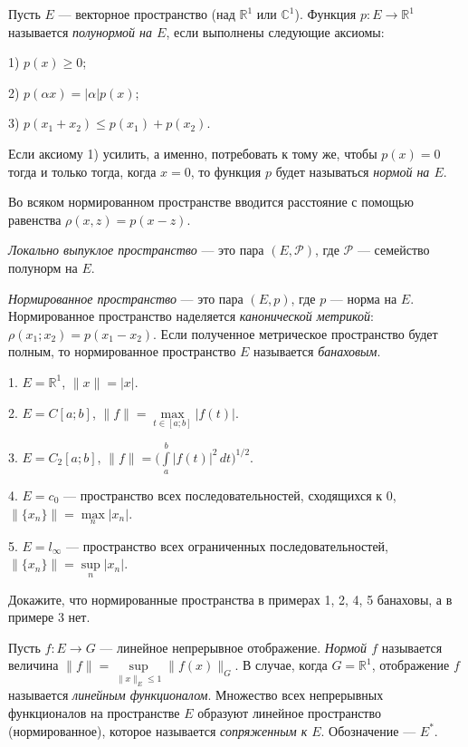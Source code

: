 \documentclass[10pt,titlepage, a4paper]{article}
\begin{document}


\begin{defen}
Пусть $E$ --- векторное пространство (над $\mathbb{R}^1$ или
$\mathbb{C}^1$). Функция $p\colon E\to\mathbb{R}^1$ называется
\emph{полунормой на $E$}, если выполнены следующие аксиомы:

1) $p(x)\geqslant0$;

2) $p(\alpha x)=|\alpha|p(x)$;

3) $p(x_1+x_2)\leqslant p(x_1)+p(x_2)$.

Если аксиому 1) усилить, а именно, потребовать к тому же, чтобы
$p(x)=0$ тогда и только тогда, когда $x=0$, то функция $p$ будет
называться \emph{нормой на $E$}.
\end{defen}

Во всяком нормированном пространстве вводится расстояние с помощью
равенства $\rho(x,z)=p(x-z)$.

\begin{defen}
\emph{Локально выпуклое пространство} --- это пара
$(E,\mathcal{P})$, где $\mathcal{P}$ --- семейство полунорм на $E$.

\emph{Нормированное пространство} --- это пара $(E,p)$, где $p$ ---
норма на $E$. Нормированное пространство наделяется
\emph{канонической метрикой}: $\rho(x_1;x_2)=p(x_1-x_2)$. Если
полученное метрическое пространство будет полным, то нормированное
пространство $E$ называется \emph{банаховым}.
\end{defen}

\prim

1. $E=\mathbb{R}^1$, $\|x\|=|x|$.

2. $E=C[a;b]$, $\|f\|=\max\limits_{t\in[a;b]}|f(t)|$.

3. $E=C_2[a;b]$,
$\|f\|=\Big(\int\limits_a^b\!|f(t)|^2\,dt\Big)^{1/2}$.

4. $E=c_0$ --- пространство всех последовательностей, сходящихся к
0, $\|\{x_n\}\|=\max\limits_n|x_n|$.

5. $E=l_\infty$ --- пространство всех ограниченных
последовательностей, $\|\{x_n\}\|=\sup\limits_n|x_n|$.

\begin{upr}
Докажите, что нормированные пространства в примерах 1, 2, 4, 5
банаховы, а в примере 3 нет.
\end{upr}

\begin{defen}
Пусть $f\colon E\to G$ --- линейное непрерывное отображение.
\emph{Нормой $f$} называется величина
$\|f\|=\sup\limits_{\|x\|_E\leqslant1}\|f(x)\|_G$. В случае, когда
$G=\mathbb{R}^1$, отображение $f$ называется \emph{линейным
функционалом}. Множество всех непрерывных функционалов на
пространстве $E$ образуют линейное пространство (нормированное),
которое называется \emph{сопряженным к $E$}. Обозначение --- $E^*$.
\end{defen}
\end{document}
